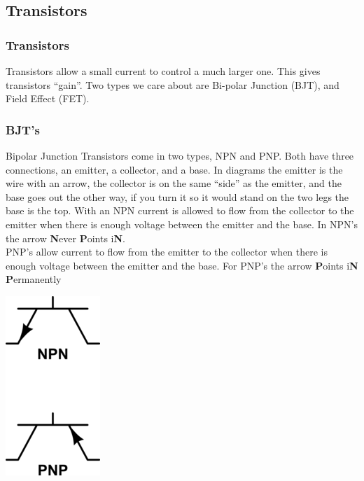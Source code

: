 \documentclass[10pt]{beamer}
\begin{document}
\subsection{Transistors}
\begin{frame}
\frametitle{Transistors}
Transistors allow a small current to control a much larger one. This gives transistors ``gain''. Two types we care about are Bi-polar Junction (BJT), and Field Effect (FET).
\end{frame}

\begin{frame}
\frametitle{BJT's}
Bipolar Junction Transistors come in two types, NPN and PNP. Both have three connections, an emitter, a collector, and a base. In diagrams the emitter is the wire with an arrow, the collector is on the same ``side'' as the emitter, and the base goes out the other way, if you turn it so it would stand on the two legs the base is the top. With an NPN current is allowed to flow from the collector to the emitter when there is enough voltage between the emitter and the base. In NPN's the arrow \textbf{N}ever \textbf{P}oints i\textbf{N}.\\PNP's allow current to flow from the emitter to the collector when there is enough voltage between the emitter and the base. For PNP's the arrow \textbf{P}oints i\textbf{N} \textbf{P}ermanently\\
\begin{center}
\includegraphics{bjts.png}
\end{center}
\end{frame}
\end{document}
